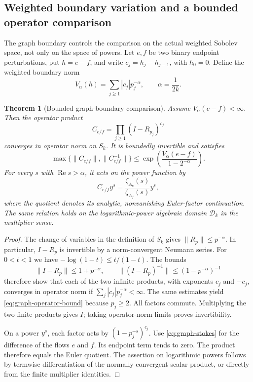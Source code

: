 \documentclass[12pt,letterpaper]{article}
\newtheorem{theorem}{Theorem}[section]
\theoremstyle{definition}
\theoremstyle{remark}
\numberwithin{equation}{section}
\newcommand{\Ree}{\operatorname{Re}}
\newcommand{\Dk}{\mathcal{D}_k}
\begin{document}
\subsection{Weighted boundary variation and a bounded operator comparison}

The graph boundary controls the comparison on the actual weighted
Sobolev space, not only on the space of powers.  Let $e,f$ be two
binary endpoint perturbations, put $h=e-f$, and write
$c_j=h_j-h_{j-1}$, with $h_0=0$.  Define the weighted boundary norm
\begin{equation}\label{eq:graph-variation}
 V_\alpha(h)=\sum_{j\ge1}|c_j|p_j^{-\alpha},
 \qquad \alpha=\frac{1}{2k}.
\end{equation}

\begin{theorem}[Bounded graph-boundary comparison]
\label{thm:graph-boundary}
Assume $V_\alpha(e-f)<\infty$.  Then the operator product
\begin{equation}\label{eq:graph-operator-product}
 C_{e/f}=\prod_{j\ge1}(I-R_{p_j})^{c_j}
\end{equation}
converges in operator norm on $S_k$.  It is boundedly invertible and
satisfies
\begin{equation}\label{eq:graph-operator-bound}
 \max\{\|C_{e/f}\|,\|C_{e/f}^{-1}\|\}
 \le \exp\!\left(\frac{V_\alpha(e-f)}{1-2^{-\alpha}}\right).
\end{equation}
For every $s$ with $\Ree s>\alpha$, it acts on the power function by
\[
 C_{e/f}y^s
 =\frac{\zeta_{A_e}(s)}{\zeta_{A_f}(s)}y^s,
\]
where the quotient denotes its analytic, nonvanishing Euler-factor
continuation.  The same relation holds on the logarithmic-power
algebraic domain $\Dk$ in the multiplier sense.
\end{theorem}

\begin{proof}
The change of variables in the definition of $S_k$ gives
$\|R_p\|\le p^{-\alpha}$.  In particular, $I-R_p$ is invertible
by a norm-convergent Neumann series.  For $0<t<1$ we have
$-\log(1-t)\le t/(1-t)$.  The bounds
\[
 \|I-R_p\|\le1+p^{-\alpha},\qquad
 \|(I-R_p)^{-1}\|\le(1-p^{-\alpha})^{-1}
\]
therefore show that each of the two infinite products, with exponents
$c_j$ and $-c_j$, converges in operator norm if
$\sum_j|c_j|p_j^{-\alpha}<\infty$.  The same estimates yield
\eqref{eq:graph-operator-bound} because $p_j\ge2$.
All factors commute.  Multiplying the two finite products gives $I$;
taking operator-norm limits proves invertibility.

On a power $y^s$, each factor acts by $(1-p_j^{-s})^{c_j}$.
Use \eqref{eq:graph-stokes} for the difference of the flows $e$ and $f$.
Its endpoint term tends to zero.  The product therefore equals the
Euler quotient.  The assertion on logarithmic powers follows by
termwise differentiation of the normally convergent scalar product,
or directly from the finite multiplier identities.
\end{proof}
\end{document}
